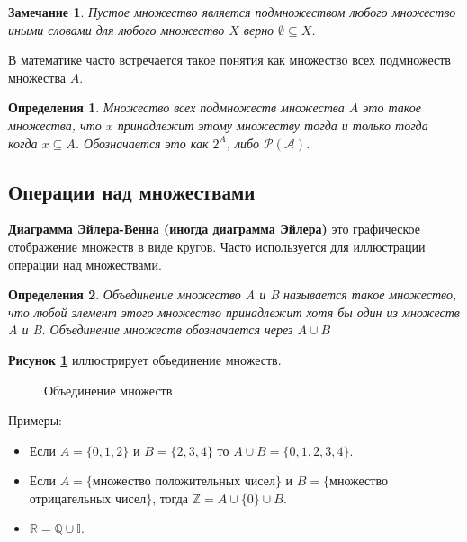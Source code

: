 \documentclass[a4paper, 16pt, oneside]{book}
\newtheorem{Definition}{Определения}[theorem]
\newtheorem{Note}{Замечание}[theorem]
\begin{document}
\begin{Note}
    \label{note:emptyset_is_subset_of_any_set}
    Пустое множество является подмножеством любого множество иными словами для любого множество \(X\) верно \(\emptyset \subseteq X\).
\end{Note}

\par В математике часто встречается такое понятия как множество всех подмножеств множества \(A\).
\begin{Definition}
    \label{definiton:set_of_all_subsets}
    Множество всех подмножеств множества \(A\) это такое множества,
    что \(x\) принадлежит этому множеству тогда и только тогда когда \(x \subseteq A\).
    Обозначается это как \(2^A\), либо \(\mathcal{P(A)}\).
\end{Definition}

\subsection{Операции над множествами}
\par \textbf{Диаграмма Эйлера-Венна (иногда диаграмма Эйлера)} это графическое отображение множеств в виде кругов.
Часто используется для иллюстрации операции над множествами.

\begin{Definition}
    \label{definition:union}
    Объединение множество A и B называется такое множество, что любой элемент этого множество принадлежит хотя бы один из множеств A и B.
    Объединение множеств обозначается через \(A \cup B\)
\end{Definition}

\par \textbf{Рисунок \ref{picture:set:union}} иллюстрирует объединение множеств.

\begin{figure}
    \centering
    \caption{Объединение множеств}
    \label{picture:set:union}
\end{figure}

\par Примеры:
\begin{itemize}
    \item Если \(A = \{0, 1, 2\}\) и \(B = \{2, 3, 4\}\) то \(A \cup B = \{0, 1, 2, 3, 4\}\).
    \item Если \(A = \{\)множество положительных чисел\(\}\) и \(B = \{\)множество отрицательных чисел\(\}\), тогда \(\mathbb{Z} = A \cup \{0\} \cup B\).
    \item \(\mathbb{R} = \mathbb{Q} \cup \mathbb{I}\).
\end{itemize}
\end{document}
